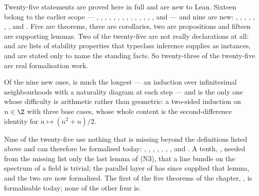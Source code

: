 Twenty-five statements are proved here in full and are new to Lean.  Sixteen
belong to the earlier scope ---
,
,
,
,
,
,
,
,
,
,
,
,
,
,
 and
 --- and nine are new:
,
,
,
,
,
,
,
 and
.  Five are theorems, three are corollaries,
two are propositions and fifteen are supporting lemmas.  Two of the
twenty-five are not really declarations at all:
 and
 are lists of stability properties that
typeclass inference supplies as instances, and are stated only to name the
standing facts.  So twenty-three of the twenty-five are real formalisation
work.

Of the nine new ones,  is much the longest
--- an induction over infinitesimal neighbourhoods with a naturality diagram at
each step --- and  is the only one whose
difficulty is arithmetic rather than geometric: a two-sided induction on
$n\in\Z$ with three base cases, whose whole content is the second-difference
identity for $n\mapsto(n^2+n)/2$.

Nine of the twenty-five use nothing that is missing beyond the definitions
listed above and can therefore be formalised today:
,
,
,
,
,
,
,
 and
.  A tenth,
, needed from the missing list only the last
lemma of (N3), that a line bundle on the spectrum of a field is trivial; the
parallel layer of  has since supplied that
lemma, and the two are now formalised.
The first of the five theorems of the chapter, , is
formalisable today; none of the other four is.

